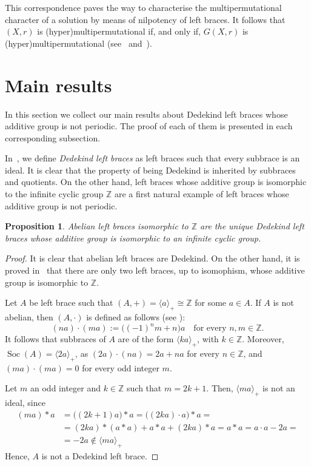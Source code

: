 \documentclass[12pt, a4paper, english]{article}
\newtheorem{proposicio}[teorema]{Proposition}
\theoremstyle{definition}
\DeclareMathOperator{\Soc}{Soc}
\begin{document}
This correspondence paves the way to characterise the multipermutational character of a solution by means of nilpotency of left braces. It follows that $(X,r)$ is (hyper)multipermutational if, and only if, $G(X,r)$ is (hyper)multipermutational (see~\cite{CedoJespersKubatVanAntwerpenVerwimp23} and~\cite{CedoSmoktunowiczVendramin19}).



\section{Main results}
\label{sec:main}

In this section we collect our main results about Dedekind left braces whose additive group is not periodic. The proof of each of them is presented in each corresponding subsection.

In~\cite{BallesterEstebanKurdachenkoPerezC-dedekind-leftbraces}, we define \emph{Dedekind left braces} as left braces such that every subbrace is an ideal. It is clear that the property of being Dedekind is inherited by subbraces and quotients. On the other hand, left braces whose additive group is isomorphic to the infinite cyclic group $\mathbb{Z}$ are a first natural example of left braces whose additive group is not periodic.

\begin{proposicio}
\label{prop:dedekindbraces-Z}
Abelian left braces isomorphic to $\mathbb{Z}$ are the unique Dedekind left braces whose additive group is isomorphic to an infinite cyclic group.
\end{proposicio}

\begin{proof}
It is clear that abelian left braces are Dedekind. On the other hand, it is proved in~\cite{Rump07-jpaa} that there are only two left braces, up to isomophism, whose additive group is isomorphic to $\mathbb{Z}$.

Let $A$ be left brace such that $(A, +) = \langle a \rangle_+ \cong \mathbb{Z}$ for some $a\in A$. If $A$ is not abelian, then $(A, \cdot)$ is defined as follows (see \cite{Rump07-jpaa}):
\[ (na) \cdot (ma) := \big((-1)^nm + n\big)a \quad \text{for every $n,m \in \mathbb{Z}$.}\] 
It follows that subbraces of $A$ are of the form $\langle ka \rangle_+$, with $k \in \mathbb{Z}$. Moreover, $\Soc(A) = \langle 2a \rangle_+$, as $(2a) \cdot (na) = 2a + na$ for every $n\in \mathbb{Z}$, and $(ma)\cdot (ma) = 0$ for every odd integer $m$. 

Let $m$ an odd integer and $k \in \mathbb{Z}$ such that $m = 2k+1$. Then, $\langle ma \rangle_+$ is not an ideal, since 
\begin{align*}
 (ma) \ast a & = \big((2k+1)a\big) \ast a = \big((2ka)\cdot a\big) \ast a = \\
& = (2ka) \ast (a \ast a) + a \ast a + (2ka) \ast a = a \ast a = a\cdot a - 2a = \\
& = -2a \notin \langle ma \rangle_+
\end{align*}
Hence, $A$ is not a Dedekind left brace.
\end{proof}
\end{document}
